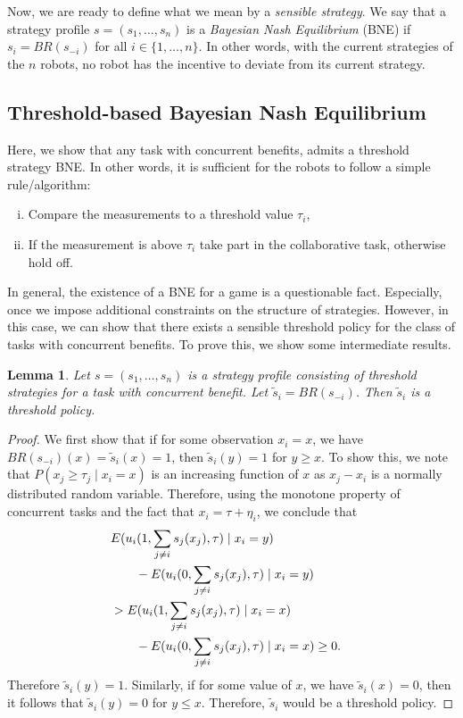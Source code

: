 \documentclass[conference]{ieeeconf}
\newtheorem{lemma}{Lemma}
\begin{document}
Now, we are ready to define what we mean by a \emph{sensible strategy}. We say that a strategy profile $s=(s_1,\ldots,s_n)$ is a \emph{Bayesian Nash Equilibrium} (BNE) \cite{fudenberg1998theory} if $s_i=BR(s_{-i})$ for all $i\in \{1,\ldots,n\}$. In other words, with the current strategies of the $n$ robots, no robot has the incentive to deviate from its current strategy.

\subsection{Threshold-based Bayesian Nash Equilibrium}\label{subsec:thmproof}
Here, we show that any task with concurrent benefits, admits a threshold strategy BNE. In other words, it is sufficient for the robots to follow a simple rule/algorithm: 
\begin{enumerate}[(i)]
\item Compare the measurements to a threshold value $\tau_i$,
\item If the measurement is above $\tau_i$ take part in the collaborative task, otherwise hold off. 
\end{enumerate}

In general, the existence of a BNE for a game is a questionable fact. Especially, once we impose additional constraints on the structure of strategies. However, in this case, we can show that there exists a sensible threshold policy for the class of tasks with concurrent benefits. To prove this, we show some intermediate results. 
\begin{lemma}\label{lemma:thresholdBR}
Let $s=(s_1,\ldots,s_n)$ is a strategy profile consisting of threshold strategies for a task with concurrent benefit. Let $\tilde{s}_i=BR(s_{-i})$. Then $\tilde{s}_i$ is a threshold policy. 
\end{lemma}
\begin{proof}
We first show that if for some observation $x_i=x$, we have $BR(s_{-i})(x)=\tilde{s}_i(x)=1$, then $\tilde{s}_i(y)=1$ for $y\geq x$. To show this,  we note that $P(x_j\geq \tau_j\mid x_i=x)$ is an increasing function of $x$ as $x_j-x_i$ is a normally distributed random variable. Therefore, using the monotone property of concurrent tasks and the fact that $x_i=\tau+\eta_i$, we conclude that 
\begin{align}
&E(u_i(1,\sum_{j\not=i}s_j(x_j),\tau)\mid x_i=y)\cr 
&\qquad-E(u_i(0,\sum_{j\not=i}s_j(x_j),\tau)\mid x_i=y)\cr 
&>E(u_i(1,\sum_{j\not=i}s_j(x_j),\tau)\mid x_i=x)\cr
&\qquad-E(u_i(0,\sum_{j\not=i}s_j(x_j),\tau)\mid x_i=x)\geq 0.
\end{align}
Therefore $\tilde{s}_i(y)=1$. Similarly, if for some value of $x$, we have $\tilde{s}_i(x)=0$, then it follows that $\tilde{s}_i(y)=0$ for $y\leq x$. Therefore, $\tilde{s}_i$ would be a threshold policy.  
\end{proof}
\end{document}
